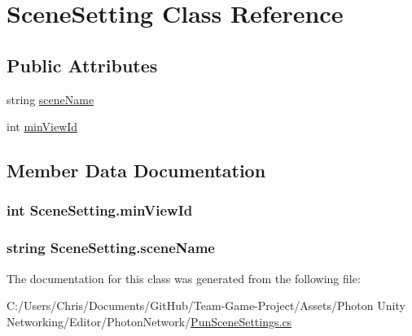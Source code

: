 \hypertarget{class_scene_setting}{}\section{Scene\+Setting Class Reference}
\label{class_scene_setting}
\subsection*{Public Attributes}
\begin{DoxyCompactItemize}
\item 
string \hyperlink{class_scene_setting_a54ea00e40e7d064c886c5fd290d183f6}{scene\+Name}
\item 
int \hyperlink{class_scene_setting_a805df6255b6432b46f90725bd60a27b1}{min\+View\+Id}
\end{DoxyCompactItemize}


\subsection{Member Data Documentation}
\subsubsection[{\texorpdfstring{min\+View\+Id}{minViewId}}]{\setlength{\rightskip}{0pt plus 5cm}int Scene\+Setting.\+min\+View\+Id}\hypertarget{class_scene_setting_a805df6255b6432b46f90725bd60a27b1}{}\label{class_scene_setting_a805df6255b6432b46f90725bd60a27b1}
\subsubsection[{\texorpdfstring{scene\+Name}{sceneName}}]{\setlength{\rightskip}{0pt plus 5cm}string Scene\+Setting.\+scene\+Name}\hypertarget{class_scene_setting_a54ea00e40e7d064c886c5fd290d183f6}{}\label{class_scene_setting_a54ea00e40e7d064c886c5fd290d183f6}


The documentation for this class was generated from the following file\+:\begin{DoxyCompactItemize}
\item 
C\+:/\+Users/\+Chris/\+Documents/\+Git\+Hub/\+Team-\/\+Game-\/\+Project/\+Assets/\+Photon Unity Networking/\+Editor/\+Photon\+Network/\hyperlink{_pun_scene_settings_8cs}{Pun\+Scene\+Settings.\+cs}\end{DoxyCompactItemize}
